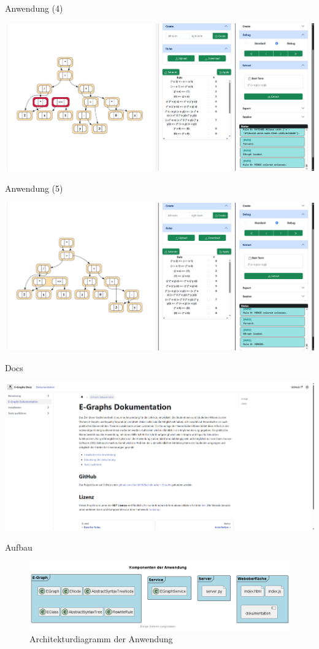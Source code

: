 \begin{frame}{Anwendung (4)}
    \begin{center}
        \includegraphics[scale=0.3]{utils/anwendung/anwendung4.png}
    \end{center}
\end{frame}

\begin{frame}{Anwendung (5)}
    \begin{center}
        \includegraphics[scale=0.3]{utils/anwendung/anwendung5.png}
    \end{center}
\end{frame}

\begin{frame}{Docs}
    \begin{center}
        \includegraphics[scale=0.3]{utils/anwendung/docs.png}
    \end{center}
\end{frame}

\begin{frame}{Aufbau}
    \begin{figure}[H]
        \centering
        \includegraphics[scale=0.43]{utils/components.png}
        \caption{Architekturdiagramm der Anwendung}
        \label{fig:comps}
    \end{figure}
\end{frame}
